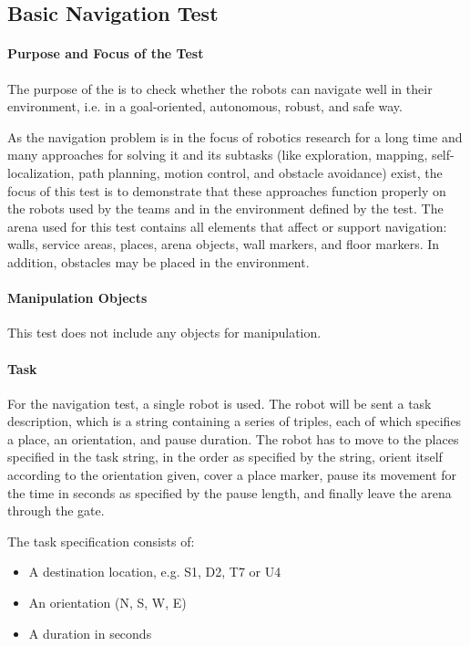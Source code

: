 \newpage
\subsection{Basic Navigation Test}

\paragraph{Purpose and Focus of the Test}
The purpose of the  is to check whether the robots can navigate well in their environment, i.e. in a goal-oriented, autonomous, robust, and safe way.
\par
As the navigation problem is in the focus of robotics research for a long time and many approaches for solving it and its subtasks (like exploration, mapping, self-localization, path planning, motion control, and obstacle avoidance) exist, the focus of this test is to demonstrate that these approaches function properly on the robots used by the teams and in the environment defined by the test.
The arena used for this test contains all elements that affect or support navigation: walls, service areas, places, arena objects, wall markers, and floor markers. In addition, obstacles may be placed in the environment.
\par
\paragraph{Manipulation Objects}
This test does not include any objects for manipulation.
\paragraph{Task}
For the navigation test, a single robot is used. The robot will be sent a task description, which is a string containing a series of triples, each of which specifies a place, an orientation, and pause duration. The robot has to move to the places specified in the task string, in the order as specified by the string, orient itself according to the orientation given, cover a place marker, pause its movement for the time in seconds as specified by the pause length, and finally leave the arena through the gate.

The task specification consists of:

\begin{itemize}
	\item A destination location, e.g. S1, D2, T7 or U4
	\item An orientation (N, S, W, E)
	\item A duration in seconds
\end{itemize}


